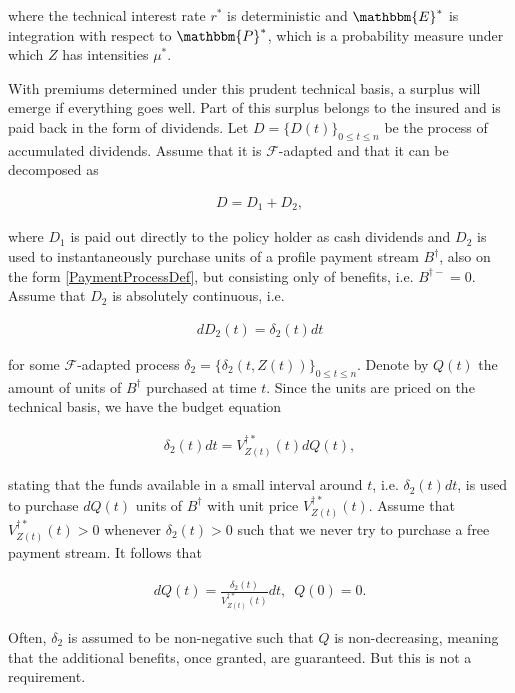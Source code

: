 \documentclass{article}
\newcommand{\1}[1]{\mathbbm{1}_{\left\lbrace #1 \right\rbrace}}
\theoremstyle{break}
\theoremstyle{remark}
\newenvironment{remark}
  {\pushQED{\qed}\renewcommand{\qedsymbol}{\scalebox{1.4}{$\circ$}}\remarkx}
  {\popQED\endremarkx}
\numberwithin{equation}{section}
\begin{document}
where the technical interest rate $r^*$ is deterministic and $\mathbbm{E}^*$ is integration with respect to $\mathbbm{P}^*$, which is a probability measure under which $Z$ has intensities $\mu^*$.

With premiums determined under this prudent technical basis, a surplus will emerge if everything goes well. Part of this surplus belongs to the insured and is paid back in the form of dividends. Let $D = \{ D(t) \}_{0 \leq t \leq n}$ be the process of accumulated dividends. Assume that it is $\mathcal{F}$-adapted and that it can be decomposed as

\begin{align*}
D = D_1 + D_2,
\end{align*}

where $D_1$ is paid out directly to the policy holder as cash dividends and $D_2$ is used to instantaneously purchase units of a profile payment stream $B^\dagger$, also on the form \ref{PaymentProcessDef}, but consisting only of benefits, i.e. $B^{\dagger -}=0$. Assume that $D_2$ is absolutely continuous, i.e.

\begin{align*}
dD_2(t) = \delta_2(t) dt
\end{align*}

for some $\mathcal{F}$-adapted process $\delta_2 = \{ \delta_2(t,Z(t)) \}_{0 \leq t \leq n}$. Denote by $Q(t)$ the amount of units of $B^\dagger$ purchased at time $t$. Since the units are priced on the technical basis, we have the budget equation

\begin{align*}
\delta_2(t) dt = V_{Z(t)}^{\dagger*}(t) dQ(t),
\end{align*}

stating that the funds available in a small interval around $t$, i.e. $\delta_2(t) dt$, is used to purchase $dQ(t)$ units of $B^\dagger$ with unit price $V_{Z(t)}^{\dagger*}(t)$. Assume that $V_{Z(t)}^{\dagger*}(t)>0$ whenever $\delta_2(t)>0$ such that we never try to purchase a free payment stream. It follows that

\begin{align} \label{QDynamics}
dQ(t) = \frac{\delta_2(t)}{V_{Z(t)}^{\dagger*}(t)}  dt, \, \, \, Q(0)=0.
\end{align}

\begin{remark}
	Often, $\delta_2$ is assumed to be non-negative such that $Q$ is non-decreasing, meaning that the additional benefits, once granted, are guaranteed. But this is not a requirement.
\end{remark}
\end{document}

